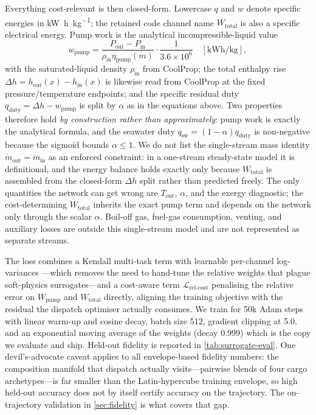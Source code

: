 \documentclass[11pt]{article}
\begin{document}
Everything cost-relevant is then closed-form. Lowercase $q$ and $w$ denote
specific energies in \si{\kilo\watt\hour\per\kilo\gram}; the retained code
channel name $W_{\text{total}}$ is also a specific electrical energy. Pump work
is the analytical incompressible-liquid value
\begin{equation}
w_{\text{pump}} =
\frac{P_{\text{out}}-P_{\text{in}}}
{\rho_{\text{in}}\eta_{\text{pump}}(\dot m)}
\cdot \frac{1}{3.6\times 10^6}
\quad [\mathrm{kWh/kg}],
\end{equation}
with the saturated-liquid density $\rho_{\text{in}}$ from CoolProp; the total
enthalpy rise $\Delta h = h_{\text{out}}(x) - h_{\text{in}}(x)$ is likewise
read from CoolProp at the fixed pressure/temperature endpoints; and the
specific residual duty $q_{\text{duty}} = \Delta h - w_{\text{pump}}$ is split by
$\alpha$ as in the equations above. Two properties therefore hold
\emph{by construction rather than approximately}: pump work is exactly the
analytical formula, and the seawater duty
$q_{\text{sw}} = (1-\alpha)q_{\text{duty}}$ is non-negative because the
sigmoid bounds $\alpha \le 1$. We do not list the single-stream mass identity
$\dot m_{\mathrm{out}} = \dot m_{\mathrm{in}}$ as an enforced constraint: in a
one-stream steady-state model it is definitional, and the energy balance holds
exactly only because $W_{\text{total}}$ is assembled from the closed-form
$\Delta h$ split rather than predicted freely.
The only quantities the network can get wrong
are $T_{\text{out}}$, $\alpha$, and the exergy diagnostic; the
cost-determining $W_{\text{total}}$ inherits the exact pump term and depends
on the network only through the scalar $\alpha$.
Boil-off gas, fuel-gas consumption, venting, and auxiliary losses are outside
this single-stream model and are not represented as separate streams.

The loss combines a Kendall multi-task term with learnable per-channel
log-variances \citep{kendall2018multi}---which removes the need to
hand-tune the relative weights that plague soft-physics surrogates---and a
cost-aware term $\mathcal{L}_{\text{rel-cost}}$ penalising the relative error
on $W_{\text{pump}}$ and $W_{\text{total}}$ directly, aligning the training
objective with the residual the dispatch optimiser actually consumes. We
train for 50k Adam steps with linear warm-up and cosine decay, batch size
512, gradient clipping at 5.0, and an exponential moving average of the
weights (decay 0.999) which is the copy we evaluate and ship. Held-out
fidelity is reported in \cref{tab:surrogate-eval}. One devil's-advocate caveat
applies to all envelope-based fidelity numbers: the composition manifold that
dispatch actually visits---pairwise blends of four cargo archetypes---is far
smaller than the Latin-hypercube training envelope, so high held-out accuracy
does not by itself certify accuracy on the trajectory. The on-trajectory
validation in \cref{sec:fidelity} is what covers that gap.
\end{document}
